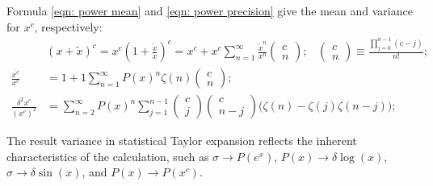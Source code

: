 \documentclass[twoside]{article}
\numberwithin{equation}{section}
\newcommand{\eqspace}{\;\;\;}
\begin{document}
Formula \eqref{eqn: power mean} and \eqref{eqn: power precision} give the mean and variance for $x^c$, respectively:
\begin{align}
\label{eqn: power Taylor}
&(x + \tilde{x})^c = x^c (1 + \frac{\tilde{x}}{x})^c = x^c + x^c \sum_{n=1}^{\infty} \frac{\tilde{x}^n}{x^n} \begin{pmatrix} c \\ n \end{pmatrix};
	\eqspace \begin{pmatrix} c \\ n \end{pmatrix} \equiv \frac{\prod_{j=0}^{n-1} (c -j)}{n!}; \\
\label{eqn: power mean}
\frac{\overline{x^c}}{x^c}  &= 1 + 1 \sum_{n=1}^{\infty} P(x)^{n} \zeta(n) \begin{pmatrix} c \\ n \end{pmatrix}; \\
\label{eqn: power precision}
\frac{\delta^2 x^c}{(x^c)^2} &= \sum_{n=2}^{\infty} P(x)^{n} \sum_{j=1}^{n-1}
  \begin{pmatrix} c \\ j \end{pmatrix} \begin{pmatrix} c \\ n - j \end{pmatrix} \big( \zeta(n) - \zeta(j) \zeta(n - j) \big);
\end{align}

The result variance in statistical Taylor expansion reflects the inherent characteristics of the calculation, such as $\sigma \rightarrow P(e^x)$, $P(x) \rightarrow \delta \log(x)$, $\sigma \rightarrow \delta \sin(x)$, and $P(x) \rightarrow P(x^c)$.
\end{document}
